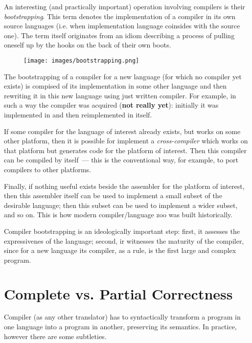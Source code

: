 An interesting (and practically important) operation involving compilers is their \emph{bootstrapping}. This term denotes the
implementation of a compiler in its own source languages (i.e. when implementation language coinsides with the source one).
The term itself originates from an idiom describing a process of pulling oneself up by the hooks on the back of their own
boots.

\begin{figure}[h]
  \centering
  \texttt{[image: images/bootstrapping.png]}
\end{figure}

The bootstrapping of a compiler for a new language (for which no compiler yet exists) is compised of its implementation
in some other language and then rewriting it in this new language using just written compiler. For example, in such a way the \lama compiler was
acquired (\textbf{not really yet}): initially it was implemented in  and then reimplemented in
\lama itself.

If some compiler for the language of interest already exists, but works on some other platform, then it is possible for
implement a \emph{cross-compiler} which works on that platform but generates code for the platform of interest. Then
this compiler can be compiled by itself~--- this is the conventional way, for example, to port  compilers
to other platforms.

Finally, if nothing useful exists beside the assembler for the platform of interest, then this assembler itself can be
used to implement a small subset of the desirable language; then this subset can be used to implement a wider subset, and so on.
This is how modern compiler/language zoo was built historically.

Compiler bootstrapping is an ideologically important step: first, it assesses the expressivenes of the language; second, ir witnesses the
maturity of the compiler, since for a new language its compiler, as a rule, is the first large and complex program.

\section{Complete vs. Partial Correctness}

Compiler (as any other translator) has to syntactically transform a program in one language into a program in another, preserving its semantics.
In practice, however there are some subtleties.

